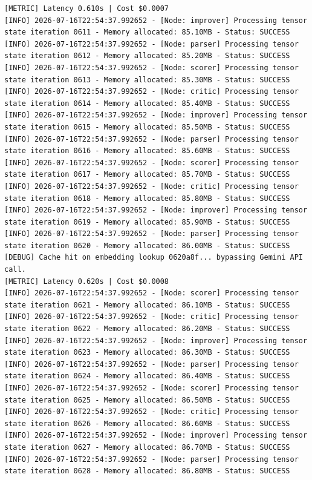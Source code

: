 \documentclass[10pt,journal,compsoc]{IEEEtran}
\begin{document}
\begin{verbatim}
[METRIC] Latency 0.610s | Cost $0.0007
[INFO] 2026-07-16T22:54:37.992652 - [Node: improver] Processing tensor state iteration 0611 - Memory allocated: 85.10MB - Status: SUCCESS
[INFO] 2026-07-16T22:54:37.992652 - [Node: parser] Processing tensor state iteration 0612 - Memory allocated: 85.20MB - Status: SUCCESS
[INFO] 2026-07-16T22:54:37.992652 - [Node: scorer] Processing tensor state iteration 0613 - Memory allocated: 85.30MB - Status: SUCCESS
[INFO] 2026-07-16T22:54:37.992652 - [Node: critic] Processing tensor state iteration 0614 - Memory allocated: 85.40MB - Status: SUCCESS
[INFO] 2026-07-16T22:54:37.992652 - [Node: improver] Processing tensor state iteration 0615 - Memory allocated: 85.50MB - Status: SUCCESS
[INFO] 2026-07-16T22:54:37.992652 - [Node: parser] Processing tensor state iteration 0616 - Memory allocated: 85.60MB - Status: SUCCESS
[INFO] 2026-07-16T22:54:37.992652 - [Node: scorer] Processing tensor state iteration 0617 - Memory allocated: 85.70MB - Status: SUCCESS
[INFO] 2026-07-16T22:54:37.992652 - [Node: critic] Processing tensor state iteration 0618 - Memory allocated: 85.80MB - Status: SUCCESS
[INFO] 2026-07-16T22:54:37.992652 - [Node: improver] Processing tensor state iteration 0619 - Memory allocated: 85.90MB - Status: SUCCESS
[INFO] 2026-07-16T22:54:37.992652 - [Node: parser] Processing tensor state iteration 0620 - Memory allocated: 86.00MB - Status: SUCCESS
[DEBUG] Cache hit on embedding lookup 0620a8f... bypassing Gemini API call.
[METRIC] Latency 0.620s | Cost $0.0008
[INFO] 2026-07-16T22:54:37.992652 - [Node: scorer] Processing tensor state iteration 0621 - Memory allocated: 86.10MB - Status: SUCCESS
[INFO] 2026-07-16T22:54:37.992652 - [Node: critic] Processing tensor state iteration 0622 - Memory allocated: 86.20MB - Status: SUCCESS
[INFO] 2026-07-16T22:54:37.992652 - [Node: improver] Processing tensor state iteration 0623 - Memory allocated: 86.30MB - Status: SUCCESS
[INFO] 2026-07-16T22:54:37.992652 - [Node: parser] Processing tensor state iteration 0624 - Memory allocated: 86.40MB - Status: SUCCESS
[INFO] 2026-07-16T22:54:37.992652 - [Node: scorer] Processing tensor state iteration 0625 - Memory allocated: 86.50MB - Status: SUCCESS
[INFO] 2026-07-16T22:54:37.992652 - [Node: critic] Processing tensor state iteration 0626 - Memory allocated: 86.60MB - Status: SUCCESS
[INFO] 2026-07-16T22:54:37.992652 - [Node: improver] Processing tensor state iteration 0627 - Memory allocated: 86.70MB - Status: SUCCESS
[INFO] 2026-07-16T22:54:37.992652 - [Node: parser] Processing tensor state iteration 0628 - Memory allocated: 86.80MB - Status: SUCCESS

\end{verbatim}
\end{document}
